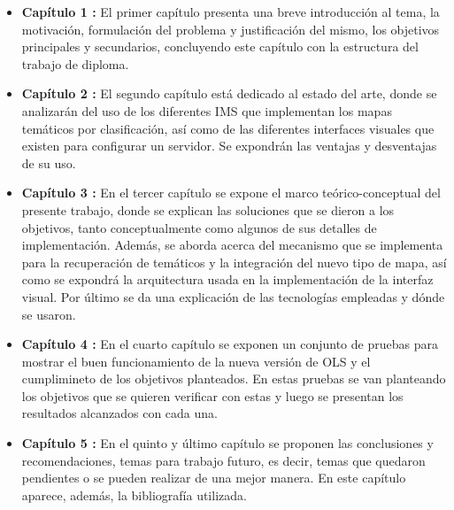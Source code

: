 \begin{itemize}
\item \textbf {Cap\'itulo 1 :} \qquad El primer cap\'itulo presenta una breve introducci\'on al tema, la motivaci\'on, formulaci\'on del problema y justificaci\'on del mismo, los objetivos principales y secundarios, concluyendo este cap\'itulo con la estructura del trabajo de diploma.
\item \textbf {Cap\'itulo 2 :} \qquad El segundo cap\'itulo est\'a dedicado al estado del arte, donde se analizar\'an del uso de los diferentes IMS que implementan los mapas tem\'aticos por clasificaci\'on, as\'i como de las diferentes interfaces visuales que existen para configurar un servidor. Se expondr\'an las ventajas y desventajas de su uso.
\item \textbf {Cap\'itulo 3 :} \qquad En el tercer cap\'itulo se expone el marco te\'orico-conceptual del presente trabajo, donde se explican las soluciones que se dieron a los objetivos, tanto conceptualmente como algunos de sus detalles de implementaci\'on. Adem\'as, se aborda acerca del mecanismo que se implementa para la recuperaci\'on de tem\'aticos y la integraci\'on del nuevo tipo de mapa, as\'i como se expondr\'a la arquitectura usada en la implementaci\'on de la interfaz visual. Por \'ultimo se da una explicaci\'on de las tecnolog\'ias empleadas y d\'onde se usaron.
\item \textbf {Cap\'itulo 4 :} \qquad En el cuarto cap\'itulo se exponen un conjunto de pruebas para mostrar el buen funcionamiento de la nueva versi\'on de OLS y el cumplimineto de los objetivos planteados. En estas pruebas se van planteando los objetivos que se quieren verificar con estas y luego se presentan los resultados alcanzados con cada una.
\item \textbf {Cap\'itulo 5 :} \qquad En el quinto y \'ultimo cap\'itulo se proponen las conclusiones y recomendaciones, temas para trabajo futuro, es decir, temas que quedaron pendientes o se pueden realizar de una mejor manera. En este cap\'itulo aparece, adem\'as, la bibliograf\'ia utilizada.
\end{itemize}



